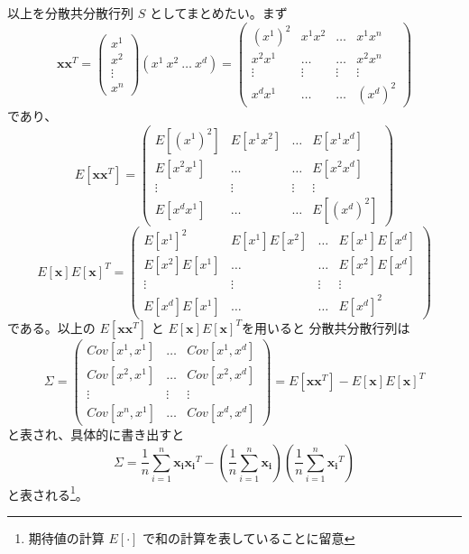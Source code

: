 \documentclass[10pt, a4paper]{ltjsarticle}
\begin{document}
以上を分散共分散行列 $S$ としてまとめたい。まず
\begin{equation}
  \bm{x}\bm{x}^T = 
  \begin{pmatrix}
    x^1 \\
    x^2 \\
    \vdots \\
    x^n
  \end{pmatrix}
  \left(x^1~x^2~\hdots~x^d\right) 
  = 
  \begin{pmatrix}
    (x^1)^2 & x^1x^2 & \hdots & x^1x^n \\
    x^2x^1 & \hdots & \hdots & x^2x^n \\
    \vdots & \vdots & \vdots & \vdots \\
    x^dx^1 & \hdots & \hdots & (x^d)^2
  \end{pmatrix}
\end{equation}
であり、
\begin{equation}
  E[\bm{x}\bm{x}^T] = 
  \begin{pmatrix}
    E[(x^1)^2]  & E[x^1x^2] & \hdots & E[x^1x^d] \\
    E[x^2x^1] & \hdots & \hdots & E[x^2x^d] \\
    \vdots & \vdots & \vdots & \vdots \\
    E[x^dx^1] & \hdots & \hdots & E[(x^d)^2]
  \end{pmatrix}
\end{equation}
\begin{equation}
  E[\bm{x}]E[\bm{x}]^T = 
  \begin{pmatrix}
    E[x^1]^2  & E[x^1]E[x^2] & \hdots & E[x^1]E[x^d] \\
    E[x^2]E[x^1] & \hdots & \hdots & E[x^2]E[x^d] \\
    \vdots & \vdots & \vdots & \vdots \\
    E[x^d]E[x^1] & \hdots & \hdots & E[x^d]^2
  \end{pmatrix}
\end{equation}
である。以上の $E[\bm{x}\bm{x}^T]$ と $E[\bm{x}]E[\bm{x}]^T$を用いると
分散共分散行列は
\begin{equation}
 \Sigma =  
  \begin{pmatrix}
    Cov[x^1,x^1] & \hdots & Cov[x^1,x^d] \\ 
    Cov[x^2,x^1] & \hdots & Cov[x^2,x^d] \\ 
    \vdots       & \vdots & \vdots \\ 
    Cov[x^n,x^1] & \hdots & Cov[x^d,x^d] 
  \end{pmatrix}
  = E[\bm{x}\bm{x}^T] -  E[\bm{x}]E[\bm{x}]^T
\end{equation}
と表され、具体的に書き出すと
\begin{equation}
 \Sigma = \frac{1}{n} \sum_{i=1}^n \bm{x_i}\bm{x_i}^T - \left(\frac{1}{n} \sum_{i=1}^n \bm{x_i} \right)\left(\frac{1}{n} \sum_{i=1}^n \bm{x_i}^T\right)
\end{equation}
と表される\footnote{期待値の計算 $E[\cdot]$ で和の計算を表していることに留意}。
\end{document}
